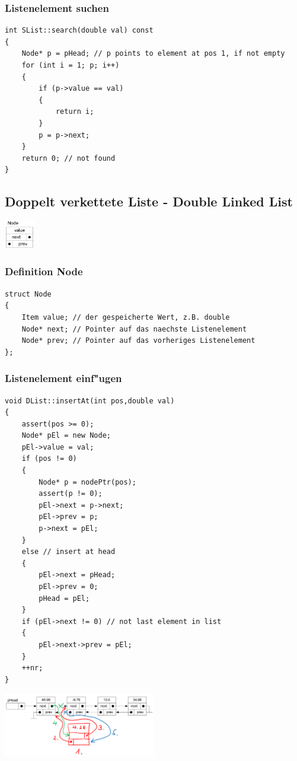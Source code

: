 \subsubsection{Listenelement suchen}
\begin{lstlisting}[style=C]
int SList::search(double val) const
{
	Node* p = pHead; // p points to element at pos 1, if not empty
	for (int i = 1; p; i++)
	{
		if (p->value == val)
		{
			return i;
		}
		p = p->next;
	}
	return 0; // not found
}
\end{lstlisting}



\subsection{Doppelt verkettete Liste - Double Linked List}
\begin{flushleft}
{\includegraphics[width=0.1\textwidth]{images/Listen/DLL.png}}
\label{Fig: Double Linked List}
\end{flushleft}
\subsubsection{Definition Node}
\begin{lstlisting}[style=C]
struct Node
{
	Item value; // der gespeicherte Wert, z.B. double
	Node* next; // Pointer auf das naechste Listenelement
	Node* prev; // Pointer auf das vorheriges Listenelement
};
\end{lstlisting}

\subsubsection{Listenelement einf"ugen}
\begin{lstlisting}[style=C]
void DList::insertAt(int pos,double val)
{
	assert(pos >= 0);
	Node* pEl = new Node;
	pEl->value = val;
	if (pos != 0)
	{
		Node* p = nodePtr(pos);
		assert(p != 0);
		pEl->next = p->next;
		pEl->prev = p;
		p->next = pEl;
	}
	else // insert at head
	{
		pEl->next = pHead;
		pEl->prev = 0;
		pHead = pEl;
	}
	if (pEl->next != 0) // not last element in list
	{
		pEl->next->prev = pEl;
	}
	++nr;
}
\end{lstlisting}
\begin{flushleft}
{\includegraphics[width=0.5\textwidth]{images/Listen/DLL_Insert.png}}
\label{Fig: Element bei DLL einf"ugen}
\end{flushleft}

